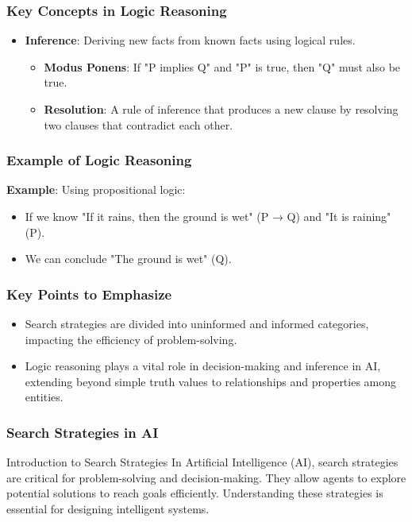 \documentclass[aspectratio=169]{beamer}
\begin{document}
\begin{frame}[fragile]
    \frametitle{Key Concepts in Logic Reasoning}
    \begin{itemize}
        \item \textbf{Inference}: Deriving new facts from known facts using logical rules.
        \begin{itemize}
            \item \textbf{Modus Ponens}: If "P implies Q" and "P" is true, then "Q" must also be true.
            \item \textbf{Resolution}: A rule of inference that produces a new clause by resolving two clauses that contradict each other.
        \end{itemize}
    \end{itemize}
\end{frame}

\begin{frame}[fragile]
    \frametitle{Example of Logic Reasoning}
    \textbf{Example}: Using propositional logic:
    \begin{itemize}
        \item If we know "If it rains, then the ground is wet" (P → Q) and "It is raining" (P).
        \item We can conclude "The ground is wet" (Q).
    \end{itemize}
\end{frame}

\begin{frame}[fragile]
    \frametitle{Key Points to Emphasize}
    \begin{itemize}
        \item Search strategies are divided into uninformed and informed categories, impacting the efficiency of problem-solving.
        \item Logic reasoning plays a vital role in decision-making and inference in AI, extending beyond simple truth values to relationships and properties among entities.
    \end{itemize}
\end{frame}

\begin{frame}[fragile]
  \frametitle{Search Strategies in AI}
  \begin{block}{Introduction to Search Strategies}
    In Artificial Intelligence (AI), search strategies are critical for problem-solving and decision-making. They allow agents to explore potential solutions to reach goals efficiently.
    Understanding these strategies is essential for designing intelligent systems.
  \end{block}
\end{frame}
\end{document}
